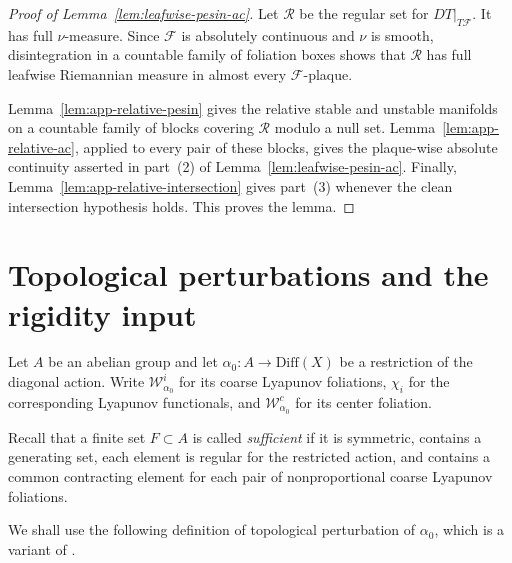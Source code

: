 \documentclass[11pt]{amsart}
\numberwithin{equation}{section}
\newcommand{\Diff}{\mathrm{Diff}}
\theoremstyle{plain}
\begin{document}
\begin{proof}[Proof of Lemma~\ref{lem:leafwise-pesin-ac}]
Let $\mathcal R$ be the regular set for $DT|_{T\mathcal F}$.  It has full
$\nu$-measure.  Since $\mathcal F$ is absolutely continuous and $\nu$ is
smooth, disintegration in a countable family of foliation boxes shows that
$\mathcal R$ has full leafwise Riemannian measure in almost every
$\mathcal F$-plaque.

Lemma~\ref{lem:app-relative-pesin} gives the relative stable and unstable
manifolds on a countable family of blocks covering $\mathcal R$ modulo a
null set.  Lemma~\ref{lem:app-relative-ac}, applied to every pair of these
blocks, gives the plaque-wise absolute continuity asserted in part~(2) of
Lemma~\ref{lem:leafwise-pesin-ac}.  Finally,
Lemma~\ref{lem:app-relative-intersection} gives part~(3) whenever the clean
intersection hypothesis holds.  This proves the lemma.
\end{proof}



\section{Topological perturbations and the rigidity input}
\label{app:topological-perturbations}


Let $A$ be an abelian group and let
$\alpha_0:A\to\Diff(X)$ be a restriction of the diagonal action.  Write
$\mathcal W^i_{\alpha_0}$ for its coarse Lyapunov foliations,
$\chi_i$ for the corresponding Lyapunov functionals, and
$\mathcal W^c_{\alpha_0}$ for its center foliation.

Recall that a finite set $F\subset A$ is called \emph{sufficient} if it is
symmetric, contains a generating set, each element is regular for the restricted action, and contains a common contracting element
for each pair of nonproportional coarse Lyapunov foliations.

We shall use the following definition of topological perturbation of $\alpha_0$, which is a variant of {\cite[Definition~5.1]{Wang26}}.
\end{document}
